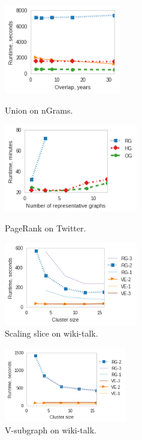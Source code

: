 \begin{figure}
\centering
\begin{minipage}[b]{2in}
\centering
\includegraphics[width=2in]{figs/union_ngrams_build13.png}
\caption{Union on nGrams.}
\label{fig:union2}
\end{minipage}
\begin{minipage}[b]{2.3in}
\centering
\includegraphics[width=2.3in]{figs/prank_twitter_build13.png}
\caption{PageRank on Twitter.}
\label{fig:pranktwitter}
\end{minipage}
\begin{minipage}[b]{2.3in}
\centering
\includegraphics[width=2.3in]{figs/slice_wikitalk_scale_build13.png}
\caption{Scaling slice on wiki-talk.}
\label{fig:slicescale}
\end{minipage}
\end{figure}

\begin{figure}[h]
\centering
\includegraphics[width=2.1in]{figs/select_wikitalk_scale_build13.png}
\caption{V-subgraph on wiki-talk.}
\label{fig:selectscale}
\vspace{-0.1in}
\end{figure}

